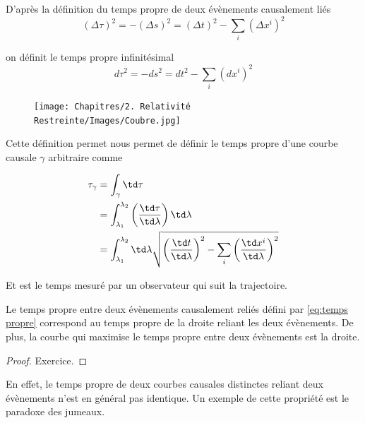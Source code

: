 D'après la définition du temps propre de deux évènements causalement liés
\begin{equation}
    \label{eq:temps propre}
   (\Delta \tau)^{2} = -(\Delta s)^2 = (\Delta t)^2 - \sum_{i}(\Delta x^{i})^2 
\end{equation}

on définit le temps propre infinitésimal
\begin{equation}
    d\tau ^2 = -ds^{2} = dt^2 - \sum_{i} (dx^{i})^2
\end{equation}
\begin{figure}
    \centering
    \texttt{[image: Chapitres/2. Relativité Restreinte/Images/Coubre.jpg]}
    \caption{}
    \label{fig:2.4}
\end{figure}

Cette définition permet nous permet de définir le temps propre d'une courbe causale $\gamma$ arbitraire comme

\begin{align}
    \tau_\gamma &= \int_{\gamma} \td\tau\\
    &= \int^{\lambda_{2}}_{\lambda_{1}}\left(\frac{\td\tau}{\td\lambda}\right)\td\lambda\\
    &= \int^{\lambda_{2}}_{\lambda_{1}} \td \lambda\sqrt{\left(\frac{\td t}{\td\lambda}\right)^2 - \sum_{i}\left(\frac{\td x^{i}}{\td\lambda}\right)^2} 
\end{align}

Et est le temps mesuré par un observateur qui suit la trajectoire. 
\begin{theoremframe}
    \begin{propri}
        Le temps propre entre deux évènements causalement reliés défini par \ref{eq:temps propre} correspond au temps propre de la droite reliant les deux évènements. De plus, la courbe qui maximise le temps propre entre deux évènements est la droite.
    \end{propri}
\end{theoremframe}
\begin{proof}
    Exercice.
\end{proof}
En effet, le temps propre de deux courbes causales distinctes reliant deux évènements n'est en général pas identique. Un exemple de cette propriété est le paradoxe des jumeaux.

